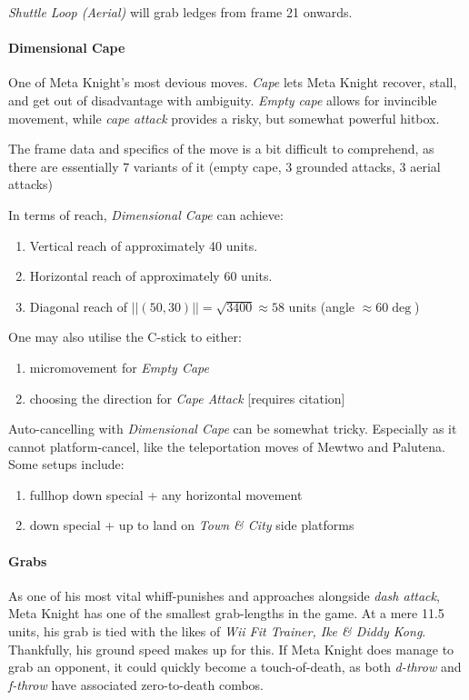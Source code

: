 \textit{Shuttle Loop (Aerial)} will grab ledges from frame 21 onwards.
\paragraph[Down Special]{Dimensional Cape}
One of Meta Knight's most devious moves. \textit{Cape} lets Meta Knight recover, stall, and get out of disadvantage with ambiguity. \textit{Empty cape} allows for invincible movement, while \textit{cape attack} provides a risky, but somewhat powerful hitbox.

The frame data and specifics of the move is a bit difficult to comprehend, as there are essentially 7 variants of it (empty cape, 3 grounded attacks, 3 aerial attacks)

In terms of reach, \textit{Dimensional Cape} can achieve:
\begin{enumerate}[label = \roman*.]
	\item Vertical reach of approximately 40 units.
	\item Horizontal reach of approximately 60 units.
	\item Diagonal reach of $||(50, 30)|| = \sqrt{3400} \approx 58$ units (angle $\approx 60\deg$)
\end{enumerate}
One may also utilise the C-stick to either:
\begin{enumerate}[label = \roman*.]
	\item micromovement for \textit{Empty Cape}
	\item choosing the direction for \textit{Cape Attack} [requires citation] %
\end{enumerate}

Auto-cancelling with \textit{Dimensional Cape} can be somewhat tricky. Especially as it cannot platform-cancel, like the teleportation moves of Mewtwo and Palutena. 
Some setups include:
\begin{enumerate}[label = \roman*.]
	\item fullhop down special + any horizontal movement
	\item down special + up to land on \textit{Town \& City} side platforms
\end{enumerate}

\paragraph{Grabs}
As one of his most vital whiff-punishes and approaches alongside \textit{dash attack}, Meta Knight has one of the smallest grab-lengths in the game. At a mere 11.5 units, his grab is tied with the likes of \textit{Wii Fit Trainer, Ike \& Diddy Kong}. Thankfully, his ground speed makes up for this. If Meta Knight does manage to grab an opponent, it could quickly become a touch-of-death, as both \textit{d-throw} and \textit{f-throw} have associated zero-to-death combos.

